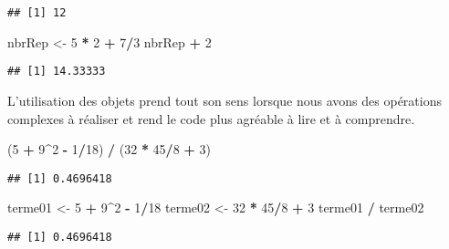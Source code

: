 \documentclass[]{book}
\newenvironment{Shaded}{\begin{snugshade}}{\end{snugshade}}
\newcommand{\DecValTok}[1]{\textcolor[rgb]{0.00,0.00,0.81}{#1}}
\newcommand{\StringTok}[1]{\textcolor[rgb]{0.31,0.60,0.02}{#1}}
\newcommand{\OperatorTok}[1]{\textcolor[rgb]{0.81,0.36,0.00}{\textbf{#1}}}
\newcommand{\NormalTok}[1]{#1}
\theoremstyle{definition}
\theoremstyle{definition}
\theoremstyle{definition}
\theoremstyle{remark}
\begin{document}
\begin{verbatim}
## [1] 12
\end{verbatim}

\begin{Shaded}
\begin{Highlighting}[]
\NormalTok{nbrRep <-}\StringTok{ }\DecValTok{5} \OperatorTok{*}\StringTok{ }\DecValTok{2} \OperatorTok{+}\StringTok{ }\DecValTok{7}\OperatorTok{/}\DecValTok{3}
\NormalTok{nbrRep }\OperatorTok{+}\StringTok{ }\DecValTok{2}
\end{Highlighting}
\end{Shaded}

\begin{verbatim}
## [1] 14.33333
\end{verbatim}

L'utilisation des objets prend tout son sens lorsque nous avons des
opérations complexes à réaliser et rend le code plus agréable à lire et
à comprendre.

\begin{Shaded}
\begin{Highlighting}[]
\NormalTok{(}\DecValTok{5} \OperatorTok{+}\StringTok{ }\DecValTok{9}\OperatorTok{^}\DecValTok{2} \OperatorTok{-}\StringTok{ }\DecValTok{1}\OperatorTok{/}\DecValTok{18}\NormalTok{) }\OperatorTok{/}\StringTok{ }\NormalTok{(}\DecValTok{32} \OperatorTok{*}\StringTok{ }\DecValTok{45}\OperatorTok{/}\DecValTok{8} \OperatorTok{+}\StringTok{ }\DecValTok{3}\NormalTok{)}
\end{Highlighting}
\end{Shaded}

\begin{verbatim}
## [1] 0.4696418
\end{verbatim}

\begin{Shaded}
\begin{Highlighting}[]
\NormalTok{terme01 <-}\StringTok{ }\DecValTok{5} \OperatorTok{+}\StringTok{ }\DecValTok{9}\OperatorTok{^}\DecValTok{2} \OperatorTok{-}\StringTok{ }\DecValTok{1}\OperatorTok{/}\DecValTok{18}
\NormalTok{terme02 <-}\StringTok{ }\DecValTok{32} \OperatorTok{*}\StringTok{ }\DecValTok{45}\OperatorTok{/}\DecValTok{8} \OperatorTok{+}\StringTok{ }\DecValTok{3}
\NormalTok{terme01 }\OperatorTok{/}\StringTok{ }\NormalTok{terme02}
\end{Highlighting}
\end{Shaded}

\begin{verbatim}
## [1] 0.4696418
\end{verbatim}
\end{document}
